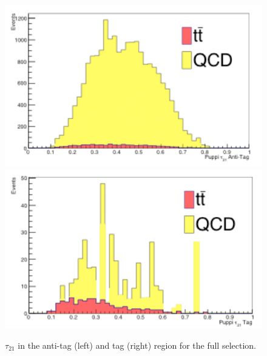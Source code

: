 \begin{figure}[thb!]
\begin{center}
\includegraphics[scale=0.55]{Figures/tau21AT.pdf}
\includegraphics[scale=0.55]{Figures/tau21T.pdf}\\
\end{center}
\caption{$\tau_{21}$ in the anti-tag (left) and tag (right) region for the full selection.}
\label{fig:tauATT}
\end{figure}


